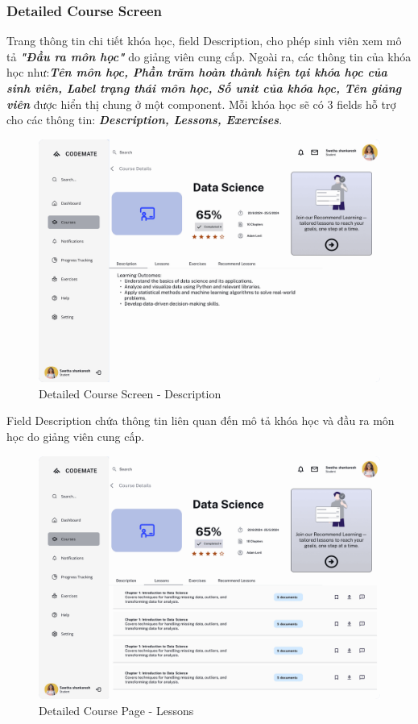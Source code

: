 \subsubsection{Detailed Course Screen}
Trang thông tin chi tiết khóa học, field Description, cho phép sinh viên xem mô tả \textbf{\textit{"Đầu ra môn học"}} do giảng viên cung cấp. Ngoài ra, các thông tin của khóa học như:\textbf{\textit{Tên môn học, Phần trăm hoàn thành hiện tại khóa học của sinh viên, Label trạng thái môn học, Số unit của khóa học, Tên giảng viên}} được hiển thị chung ở một component. Mỗi khóa học sẽ có 3 fields hỗ trợ cho các thông tin: \textbf{\textit{Description, Lessons, Exercises}}. 
\begin{figure}[H]
    \centering
    \includegraphics[width=0.7\linewidth]{Images/figmaDesign/Detailed Course Page - Description.png}
    \caption{Detailed Course Screen - Description}
    \label{fig:enter-label}
\end{figure}
Field Description chứa thông tin liên quan đến mô tả khóa học và đầu ra môn học do giảng viên cung cấp.
\begin{figure}[H]
    \centering
    \includegraphics[width=0.7\linewidth]{Images/figmaDesign/Detailed Course Page - Lessons.png}
    \caption{Detailed Course Page - Lessons}
    \label{fig:enter-label}
\end{figure}
